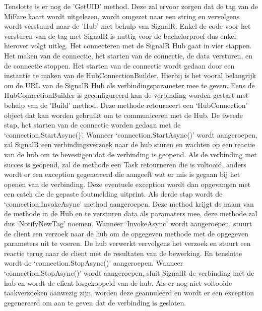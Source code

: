 Tenslotte is er nog de 'GetUID’ method. Deze zal ervoor zorgen dat de tag van de MiFare kaart wordt uitgelezen, wordt omgezet naar een string en vervolgens wordt verstuurd naar de 'Hub’ met behulp van SignalR. Enkel de code voor het versturen van de tag met SignalR is nuttig voor de bachelorproef dus enkel hierover volgt uitleg. Het connecteren met de SignalR Hub gaat in vier stappen. Het maken van de connectie, het starten van de connectie, de data versturen, en de connectie stoppen. Het starten van de connectie wordt gedaan door een instantie te maken van de HubConnectionBuilder. Hierbij is het vooral belangrijk om de URL van de SignalR Hub als verbindingsparameter mee te geven. Eens de HubConnectionBuilder is geconfigureerd kan de verbinding worden gestart met behulp van de 'Build’ method. Deze methode retourneert een ‘HubConnection’ object dat kan worden gebruikt om te communiceren met de Hub. De tweede stap, het starten van de connectie worden gedaan met de ‘connection.StartAsync()’. Wanneer ‘connection.StartAsync()’ wordt aangeroepen, zal SignalR een verbindingsverzoek naar de hub sturen en wachten op een reactie van de hub om te bevestigen dat de verbinding is geopend. Als de verbinding met succes is geopend, zal de methode een Task retourneren die is voltooid, anders wordt er een exception gegenereerd die aangeeft wat er mis is gegaan bij het openen van de verbinding. Deze eventuele exception wordt dan opgevangen met een catch die de gepaste foutmelding uitprint. Als derde stap wordt de ‘connection.InvokeAsync’ method aangeroepen. Deze method krijgt de naam van de methode in de Hub en te versturen data als paramaters mee, deze methode zal dus ‘NotifyNewTag’ noemen. Wanneer ‘InvokeAsync’ wordt aangeroepen, stuurt de client een verzoek naar de hub om de opgegeven methode met de opgegeven parameters uit te voeren. De hub verwerkt vervolgens het verzoek en stuurt een reactie terug naar de client met de resultaten van de bewerking. En tenslotte wordt de ‘connection.StopAsync()’ aangeroepen. Wanneer ‘connection.StopAsync()’ wordt aangeroepen, sluit SignalR de verbinding met de hub en wordt de client losgekoppeld van de hub. Als er nog niet voltooide taakverzoeken aanwezig zijn, worden deze geannuleerd en wordt er een exception gegenereerd om aan te geven dat de verbinding is gesloten.

